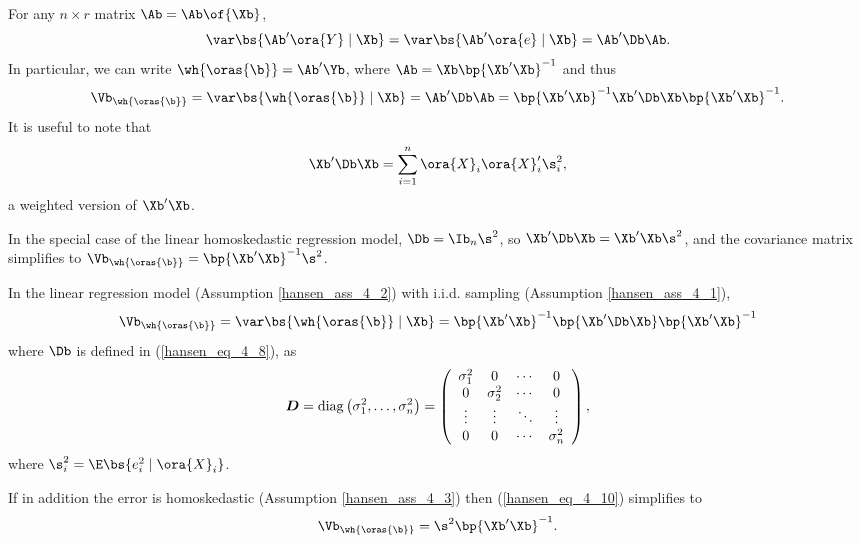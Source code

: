For any $n \times r$ matrix $\Ab = \Ab\of{\Xb}$,
\begin{equation}
    \label{hansen_eq_4_9}
    \var\bs{\Ab^\prime \ora{Y} \mid \Xb} = \var\bs{\Ab^\prime \ora{e} \mid \Xb} = \Ab^\prime \Db \Ab.
\end{equation}
In particular, we can write $\wh{\oras{\b}} = \Ab^\prime \Yb$, where $\Ab = \Xb \bp{\Xb^\prime \Xb}^{-1}$ and thus 
\begin{equation}
    \notag
    \Vb_{\wh{\oras{\b}}} = \var\bs{\wh{\oras{\b}} \mid \Xb} = \Ab^\prime \Db \Ab = \bp{\Xb^\prime \Xb}^{-1} \Xb^\prime \Db \Xb \bp{\Xb^\prime \Xb}^{-1}.
\end{equation}
It is useful to note that 
\begin{equation}
    \notag
    \Xb^\prime \Db \Xb = \sum_{i=1}^n \ora{X}_i \ora{X}_i^\prime \s_i^2,
\end{equation}
a weighted version of $\Xb^\prime \Xb$.

In the special case of the linear homoskedastic regression model, $\Db = \Ib_n \s^2$, so $\Xb^\prime \Db \Xb = \Xb^\prime \Xb \s^2$, and the covariance matrix simplifies to $\Vb_{\wh{\oras{\b}}} = \bp{\Xb^\prime \Xb}^{-1} \s^2$.

\begin{theorem}
    \label{hansen_thm_4_2}

    In the linear regression model (Assumption \ref{hansen_ass_4_2}) with i.i.d. sampling (Assumption \ref{hansen_ass_4_1}),
    \begin{equation}
        \label{hansen_eq_4_10}
        \Vb_{\wh{\oras{\b}}} = \var\bs{\wh{\oras{\b}} \mid \Xb} = \bp{\Xb^\prime \Xb}^{-1} \bp{\Xb^\prime \Db \Xb} \bp{\Xb^\prime \Xb}^{-1}
    \end{equation}
    where $\Db$ is defined in (\ref{hansen_eq_4_8}), as 
    \begin{equation}
        \notag
        \boldsymbol{D}=\operatorname{diag}\left(\sigma_1^2, \ldots, \sigma_n^2\right)=\left(\begin{array}{cccc}
            \sigma_1^2 & 0 & \cdots & 0 \\
            0 & \sigma_2^2 & \cdots & 0 \\
            \vdots & \vdots & \ddots & \vdots \\
            0 & 0 & \cdots & \sigma_n^2
        \end{array}\right),
    \end{equation}
    where $\s_i^2 = \E\bs{e_i^2 \mid \ora{X}_i}$.  
    
    If in addition the error is homoskedastic (Assumption \ref{hansen_ass_4_3}) then (\ref{hansen_eq_4_10}) simplifies to 
    $$\Vb_{\wh{\oras{\b}}} = \s^2 \bp{\Xb^\prime \Xb}^{-1}.$$
\end{theorem}


